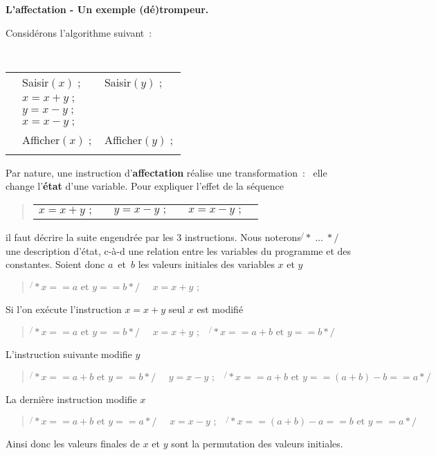 \addtocounter{section}{1}
\centerline{\Large \bf L'affectation - Un exemple (d\'e)trompeur. }
\label{Permutation}

\noindent\hrulefill

Consid\'erons l'algorithme suivant~:

{\tt
\begin{tabular}{rll}
      & Saisir$(x)  \; ;$     &  Saisir$(y) \; ; $   \\
                   & $x = x + y \; ; $ &                   \\
                   & $y = x - y \; ; $ &                   \\
                   & $x = x - y \; ; $ &                   \\
                   & Afficher$(x) \; ;$   &  Afficher$(y) \; ; $  \\
       	          &   &
\end{tabular}
}

Par nature, une instruction d'{\bf affectation} r\'ealise une transformation~:~ elle
change l'{\bf \'etat} d'une variable. Pour expliquer l'effet de la s\'equence
\begin{quote}  
\begin{tabular}{lll}
$ x = x+y \mbox{ ;~~~} $ & $ y= x-y \mbox{ ;~~~} $ & $ x = x - y  \mbox{ ;~~~}$
\end{tabular}
\end{quote}
il faut d\'ecrire la suite engendr\'ee par les 3 instructions. Nous noterons
$\not{ }\ast \; \ldots \; \ast\!\!/$ une description d'\'etat, {c-\`a-d} une
relation entre les variables du programme et des constantes. Soient donc
$a$~et~$b$ les valeurs initiales des variables $x$ et $y$
\begin{quote}
$\not{ }\ast x == a \mbox{ et } y == b \ast\!\!/\mbox{~~~~} x = x + y  \mbox{ ; } $
\end{quote}

Si l'on ex\'ecute l'instruction $x = x + y $  seul $x$ est modifi\'e
\begin{quote}
$\not{ }\ast x == a \mbox{ et } y == b \ast\!\!/\mbox{~~~~} x = x + y \mbox{ ;~~~~} \not{ }\ast x == a + b \mbox{ et } y == b \ast\!\!/ $
\end{quote}
L'instruction suivante  modifie  $y$
\begin{quote}
$\not{ }\ast x == a + b\mbox{ et } y == b \ast\!\!/\mbox{~~~~} y = x - y  \mbox{ ;~~~~} 
                    \not{ }\ast x == a + b  \mbox{ et } y == (a + b) - b == a \ast\!\!/$
\end{quote}
La derni\`ere instruction modifie $x$
\begin{quote}
$\not{ }\ast x == a + b \mbox{ et }  y == a \ast\!\!/ \mbox{~~~~}x = x - y  \mbox{ ;~~~~} 
                     \not{ }\ast x == (a + b) - a == b \mbox{ et } y == a \ast\!\!/$ 
\end{quote}
Ainsi donc les valeurs finales de $x$ et $y$ sont la permutation
des valeurs initiales.

